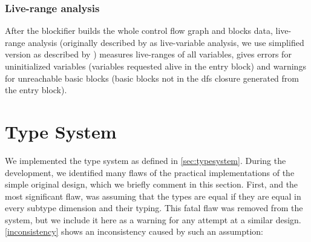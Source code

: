\subsubsection{Live-range analysis}


After the blockifier builds the whole control flow graph and blocks data, live-range analysis (originally described by \citet{Aho2006compilers} as live-variable analysis, we use simplified version as described by \citet{bednarek2008compilers}) measures live-ranges of all variables, gives errors for uninitialized variables (variables requested alive in the entry block) and warnings for unreachable basic blocks (basic blocks not in the dfs closure generated from the entry block).


\section{Type System}

We implemented the type system as defined in \cref{sec:typesystem}. During the development, we identified many flaws of the practical implementations of the simple original design, which we briefly comment in this section. First, and the most significant flaw, was assuming that the types are equal if they are equal in every subtype dimension and their typing. This fatal flaw was removed from the system, but we include it here as a warning for any attempt at a similar design. \cref{inconsistency} shows an inconsistency caused by such an assumption:

